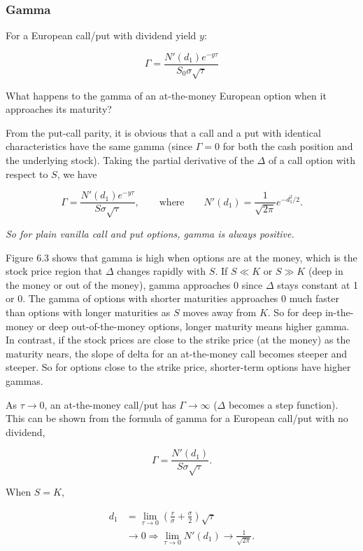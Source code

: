 \subsubsection*{Gamma}

For a European call/put with dividend yield $y$:

\[
\Gamma=\frac{N'(d_1)e^{-y\tau}}{S_0\sigma\sqrt{\tau}}
\]


\begin{problem}{What happens to the gamma of an at-the-money European option when it approaches
its maturity?}
\end{problem}

\begin{solution}
From the put-call parity, it is obvious that a call and a put with identical
characteristics have the same gamma (since $\Gamma=0$ for both the cash position and the
underlying stock). Taking the partial derivative of the $\Delta$ of a call option with
respect to $S$, we have

\[
\Gamma=\frac{N'(d_1)e^{-y\tau}}{S\sigma\sqrt{\tau}},
\qquad\text{where}\qquad
N'(d_1)=\frac{1}{\sqrt{2\pi}}e^{-d_1^2/2}.
\]

\noindent\emph{So for plain vanilla call and put options, gamma is always positive.}

Figure 6.3 shows that gamma is high when options are at the money, which is the stock
price region that $\Delta$ changes rapidly with $S$. If $S\ll K$ or $S\gg K$ (deep in the
money or out of the money), gamma approaches 0 since $\Delta$ stays constant at 1 or 0.
The gamma of options with shorter maturities approaches 0 much faster than options with
longer maturities as $S$ moves away from $K$. So for deep in-the-money or deep
out-of-the-money options, longer maturity means higher gamma. In contrast, if the stock
prices are close to the strike price (at the money) as the maturity nears, the slope of delta
for an at-the-money call becomes steeper and steeper. So for options close to the strike
price, shorter-term options have higher gammas.

As $\tau\to0$, an at-the-money call/put has $\Gamma\to\infty$ ($\Delta$ becomes a step
function). This can be shown from the formula of gamma for a European call/put with no
dividend,

\[
\Gamma=\frac{N'(d_1)}{S\sigma\sqrt{\tau}}.
\]

When $S=K$,

\[
\begin{aligned}
d_1&=\lim_{\tau\to0}\left(\frac{r}{\sigma}+\frac{\sigma}{2}\right)\sqrt{\tau}\\
&\to0\Rightarrow\lim_{\tau\to0}N'(d_1)\to\frac{1}{\sqrt{2\pi}}.
\end{aligned}
\]


\end{solution}
